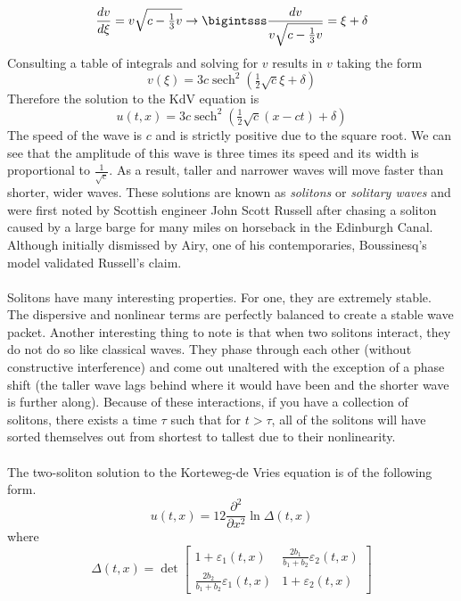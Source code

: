 \documentclass{article}
\newcommand{\od}[2]{\frac{d #1}{d #2}}
\newcommand{\pdt}[2]{\frac{\partial ^2 #1}{\partial #2 ^2}}
\numberwithin{equation}{section}
\begin{document}
\begin{equation}
    \od{v}{\xi} =v\sqrt{c-\tfrac{1}{3}v} \rightarrow \bigintsss\frac{dv}{v\sqrt{c-\tfrac{1}{3}v}} = \xi+\delta
\end{equation}
Consulting a table of integrals and solving for $v$ results in $v$ taking the form 
\begin{equation}
    v(\xi) =3c\operatorname{sech}^2(\tfrac{1}{2}\sqrt{c}\xi+\delta)
\end{equation}
Therefore the solution to the KdV equation is 
\begin{equation}
    u(t,x) = 3c\operatorname{sech}^2(\tfrac{1}{2}\sqrt{c}(x-ct)+\delta )
\end{equation}
The speed of the wave is $c$ and is strictly positive due to the square root. We can see that the amplitude of this wave is three times its speed and its width is proportional to $\frac{1}{\sqrt{c}}$. As a result, taller and narrower waves will move faster than shorter, wider waves. These solutions are known as \textit{solitons} or \textit{solitary waves} and were first noted by Scottish engineer John Scott Russell after chasing a soliton caused by a large barge for many miles on horseback in the Edinburgh Canal. Although initially dismissed by Airy, one of his contemporaries, Boussinesq's model validated Russell's claim. \\\\
Solitons have many interesting properties. For one, they are extremely stable. The dispersive and nonlinear terms are perfectly balanced to create a stable wave packet. Another interesting thing to note is that when two solitons interact, they do not do so like classical waves. They phase through each other (without constructive interference) and come out unaltered with the exception of a phase shift (the taller wave lags behind where it would have been and the shorter wave is further along). Because of these interactions, if you have a collection of solitons, there exists a time $\tau$ such that for $t>\tau$, all of the solitons will have sorted themselves out from shortest to tallest due to their nonlinearity. \\\\
The two-soliton solution to the Korteweg-de Vries equation is of the following form.
\begin{equation}
    u(t,x) =12\pdt{}{x} \ln\Delta(t,x) \label{eq;3.73}
\end{equation}
where 
\begin{equation}
    \Delta(t,x) = \det 
    \begin{bmatrix}
        1+\varepsilon_1(t,x)  &\frac{2b_1}{b_1+b_2}\varepsilon_2(t,x) \\
        \frac{2b_2}{b_1+b_2}\varepsilon_1(t,x) &1+\varepsilon_2(t,x)
    \end{bmatrix}
\end{equation}
\end{document}
